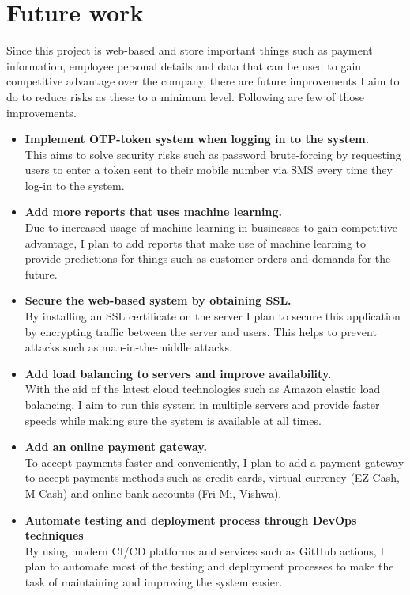 \documentclass[12pt]{report}
\begin{document}
\section{Future work}
Since this project is web-based and store important things such as payment information, employee personal details and data that can be used to gain competitive advantage over the company, there are future improvements I aim to do to reduce risks as these to a minimum level. Following are few of those improvements.

\begin{itemize}
	\item {\bf{Implement OTP-token system when logging in to the system.}} \\
	      This aims to solve security risks such as password brute-forcing by requesting users to enter a token sent to their mobile number via SMS every time they log-in to the system.

	\item {\bf{Add more reports that uses machine learning.}} \\
	      Due to increased usage of machine learning in businesses to gain competitive advantage, I plan to add reports that make use of machine learning to provide predictions for things such as customer orders and demands for the future.

	\item {\bf{Secure the web-based system by obtaining SSL.}} \\
	      By installing an SSL certificate on the server I plan to secure this application by encrypting traffic between the server and users. This helps to prevent attacks such as man-in-the-middle attacks.

	\item {\bf{Add load balancing to servers and improve availability.}} \\
	      With the aid of the latest cloud technologies such as Amazon elastic load balancing, I aim to run this system in multiple servers and provide faster speeds while making sure the system is available at all times.

	\item {\bf{Add an online payment gateway.}} \\
	      To accept payments faster and conveniently, I plan to add a payment gateway to accept payments methods such as credit cards, virtual currency (EZ Cash, M Cash) and online bank accounts (Fri-Mi, Vishwa).

	\item {\bf{Automate testing and deployment process through DevOps techniques}} \\
	      By using modern CI/CD platforms and services such as GitHub actions, I plan to automate most of the testing and deployment processes to make the task of maintaining and improving the system easier.
\end{itemize}
\end{document}

